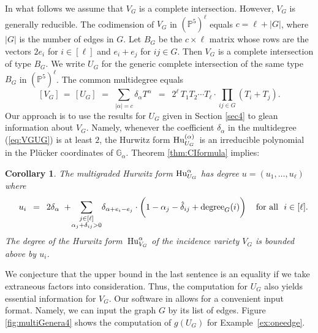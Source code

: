 \documentclass[12pt]{article}
\newtheorem{corollary}[theorem]{Corollary}
\theoremstyle{definition}
\newcommand{\bG}{\mathbb G}
\newcommand{\bP}{\mathbb P}
\begin{document}
In what follows we assume that $V_G$ is a complete intersection.
However, $V_G$ is generally reducible. The codimension
of $V_G$ in $(\bP^5)^\ell$ equals $c = \ell+ |G|$, where $|G|$ is the number of edges in $G$.
Let $B_G$ be the $c \times \ell$ matrix whose rows are the vectors
$2e_i$ for $i \in [\ell]$ and $e_i+e_j$ for $ij \in G$.
Then $V_G$ is a complete intersection of type $B_G$.
We write $U_G$ for the generic complete intersection
of the same type $B_G$ in $(\bP^5)^\ell$. The common multidegree equals
\begin{equation}
\label{eq:VGUG}
 [V_G] \,=\, [U_G] \, \,=\,\,\sum_{|\alpha| = c} \delta_\alpha T^\alpha \,\,\,=\,\,\,
2^\ell\, T_1 T_2 \cdots T_\ell \cdot \prod_{ij \in G} (T_i + T_j) .
\end{equation}
Our approach is to use the results for $U_G$ given in Section \ref{sec4}
to glean information about $V_G$.
Namely, whenever the coefficient $\delta_\alpha$ in the multidegree (\ref{eq:VGUG}) 
is at least $2$, the Hurwitz form ${\rm Hu}^{(\alpha)}_{U_G}\,$ is an irreducible
polynomial in the Pl\"ucker coordinates of $\bG_\alpha$.
Theorem \ref{thm:CIformula} implies:

\begin{corollary}
The multigraded Hurwitz form ${\rm Hu}^{\alpha}_{U_G}$ has degree $u=(u_1,\ldots,u_\ell)$ where
$$
     \quad u_i \,\,\,= \,\,\,2 \delta_\alpha  \, \, +\!
     \sum_{\substack{j\in[\ell]\\\alpha_j+\delta_{ij}>0}}
     \! \delta_{\alpha+e_i-e_j} \cdot \biggl(1-\alpha_j-\hat{\delta}_{ij}+{\rm degree}_G(i)
           \biggr)\,
\quad \hbox{for all}\,\,\, \,i \in [\ell] .
$$
The degree of the Hurwitz form $\,{\rm Hu}^{\alpha}_{V_G}$ 
of the incidence variety $V_G$ is bounded above by $u_i$.
\end{corollary}

We conjecture that the upper bound in the last sentence is an equality
if we take extraneous factors into consideration.
Thus, the computation for $U_G$ also yields
essential information for $V_G$. Our software in \cite{zenodo} allows for a convenient
input format. Namely, we can input the graph $G$ by its list of edges.
Figure \ref{fig:multiGenera4} shows the computation of $g(U_G)$ for
Example~\ref{ex:oneedge}.
\end{document}
